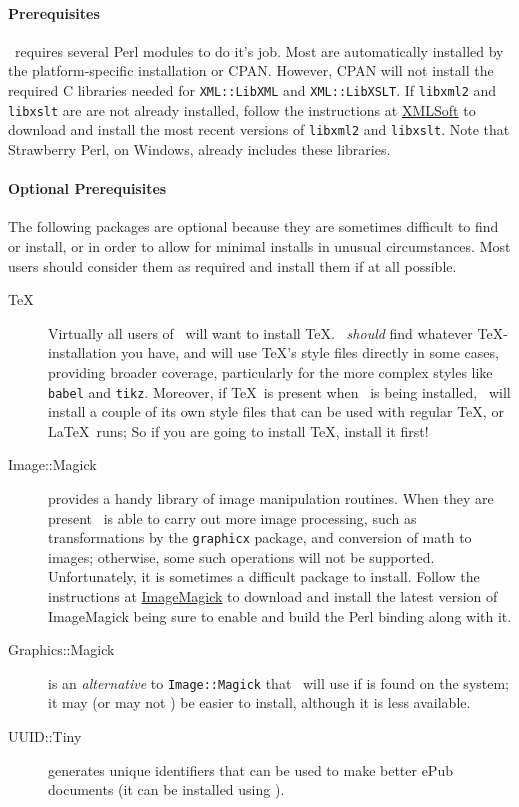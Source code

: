 \documentclass{article}
\begin{document}
\paragraph{Prerequisites}\label{prerequisites}
\LaTeXML\ requires several Perl modules to do it's job.  Most
are automatically installed by the platform-specific installation or CPAN.
However, CPAN will not install the required C libraries needed for
\texttt{XML::LibXML} and \texttt{XML::LibXSLT}.
If \texttt{libxml2} and \texttt{libxslt} are are not already installed,
follow the instructions at \href{http://www.xmlsoft.org}{XMLSoft} to
download and install the most recent versions of \texttt{libxml2} and \texttt{libxslt}.
Note that Strawberry Perl, on Windows, already includes these libraries.

\paragraph{Optional Prerequisites}
The following packages are optional because they are sometimes difficult
to find or install, or in order to allow for minimal installs in unusual
circumstances.  Most users should consider them as required and install
them if at all possible.
\begin{description}
\item[\TeX] Virtually all users of \LaTeXML\ will want to install \TeX.  \LaTeXML\ 
\emph{should} find whatever \TeX-installation you have, and will
use \TeX's style files directly in some cases, providing broader coverage,
particularly for the more complex styles like \texttt{babel} and \texttt{tikz}.
Moreover, if \TeX\ is present when \LaTeXML\ is being installed,
\LaTeXML\ will install a couple of its own style files that can be used
with regular \TeX, or \LaTeX\ runs;
So if you are going to install \TeX, install it first!

\item[Image::Magick] provides a handy library of image manipulation routines.
When they are present \LaTeXML\ is able to carry out more image processing,
such as transformations by the \texttt{graphicx} package, and conversion of math to images;
otherwise, some such operations will not be supported.
Unfortunately, it is sometimes a difficult package to install.
Follow the instructions at \href{http://www.imagemagick.org/}{ImageMagick}
to download and install the latest version of ImageMagick being sure to enable
and build the Perl binding along with it.

\item[Graphics::Magick] is an \emph{alternative} to \texttt{Image::Magick} that \LaTeXML\ will
use if is found on the system; it may (or may not ) be easier to install, although it
is less available.

\item[UUID::Tiny] generates unique identifiers that can be used to make better ePub documents
  (it can be installed using \htmlref{CPAN}{install.cpan.prereq}).

\end{description}
\end{document}
